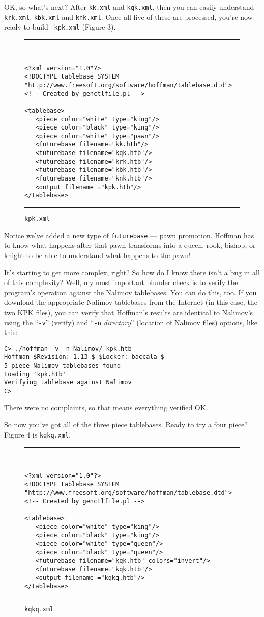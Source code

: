 \documentclass[11pt]{article}
\begin{document}
OK, so what's next?  After {\tt kk.xml} and {\tt kqk.xml}, then you
can easily understand {\tt krk.xml}, {\tt kbk.xml} and {\tt knk.xml}.
Once all five of these are processed, you're now ready to build {\tt
kpk.xml} (Figure 3).

\begin{figure}
\hrule\ 
{\small\begin{verbatim}
<?xml version="1.0"?>
<!DOCTYPE tablebase SYSTEM "http://www.freesoft.org/software/hoffman/tablebase.dtd">
<!-- Created by genctlfile.pl -->

<tablebase>
   <piece color="white" type="king"/>
   <piece color="black" type="king"/>
   <piece color="white" type="pawn"/>
   <futurebase filename="kk.htb"/>
   <futurebase filename="kqk.htb"/>
   <futurebase filename="krk.htb"/>
   <futurebase filename="kbk.htb"/>
   <futurebase filename="knk.htb"/>
   <output filename ="kpk.htb"/>
</tablebase>
\end{verbatim}}
\hrule
\caption{\tt kpk.xml}
\end{figure}

Notice we've added a new type of {\tt futurebase} --- pawn promotion.
Hoffman has to know what happens after that pawn transforms into a
queen, rook, bishop, or knight to be able to understand what happens
to the pawn!

It's starting to get more complex, right?  So how do I know there
isn't a bug in all of this complexity?  Well, my most important
blunder check is to verify the program's operation against the Nalimov
tablebases.  You can do this, too.  If you download the appropriate
Nalimov tablebases from the Internet (in this case, the two KPK
files), you can verify that Hoffman's results are identical to
Nalimov's using the ``{\tt -v}'' (verify) and ``{\tt -n} {\it
directory}'' (location of Nalimov files) options, like this:

\begin{verbatim}
C> ./hoffman -v -n Nalimov/ kpk.htb
Hoffman $Revision: 1.13 $ $Locker: baccala $
5 piece Nalimov tablebases found
Loading 'kpk.htb'
Verifying tablebase against Nalimov
C>
\end{verbatim}

There were no complaints, so that means everything verified OK.

So now you've got all of the three piece tablebases.  Ready to try a
four piece?  Figure 4 is {\tt kqkq.xml}.

\begin{figure}
\hrule\ 
{\small\begin{verbatim}
<?xml version="1.0"?>
<!DOCTYPE tablebase SYSTEM "http://www.freesoft.org/software/hoffman/tablebase.dtd">
<!-- Created by genctlfile.pl -->

<tablebase>
   <piece color="white" type="king"/>
   <piece color="black" type="king"/>
   <piece color="white" type="queen"/>
   <piece color="black" type="queen"/>
   <futurebase filename="kqk.htb" colors="invert"/>
   <futurebase filename="kqk.htb"/>
   <output filename ="kqkq.htb"/>
</tablebase>
\end{verbatim}}
\hrule
\caption{\tt kqkq.xml}
\end{figure}
\end{document}
